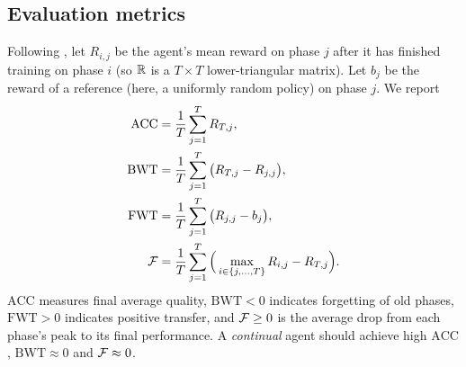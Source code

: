 \subsection{Evaluation metrics}
Following \citet{lopezpaz2017gem}, let \(R_{i,j}\) be the agent's mean reward on
phase \(j\) after it has finished training on phase \(i\) (so \(\mathbb{R}\) is a
\(T\times T\) lower-triangular matrix). Let \(b_j\) be the reward of a reference
(here, a uniformly random policy) on phase \(j\). We report
\begin{align}
  \mathrm{ACC} &= \frac{1}{T}\sum_{j=1}^{T} R_{T,j}, \label{eq:acc}\\
  \mathrm{BWT} &= \frac{1}{T}\sum_{j=1}^{T} \big(R_{T,j} - R_{j,j}\big), \label{eq:bwt}\\
  \mathrm{FWT} &= \frac{1}{T}\sum_{j=1}^{T} \big(R_{j,j} - b_j\big), \label{eq:fwt}\\
  \mathcal{F}     &= \frac{1}{T}\sum_{j=1}^{T} \Big(\max_{i\in\{j,\dots,T\}} R_{i,j} - R_{T,j}\Big). \label{eq:forgetting}
\end{align}
\(\mathrm{ACC}\) measures final average quality, \(\mathrm{BWT}<0\) indicates
forgetting of old phases, \(\mathrm{FWT}>0\) indicates positive transfer, and
\(\mathcal{F}\ge0\) is the average drop from each phase's peak to its final
performance. A \emph{continual} agent should achieve high \(\mathrm{ACC}\),
\(\mathrm{BWT}\approx0\) and \(\mathcal{F}\approx0\).
